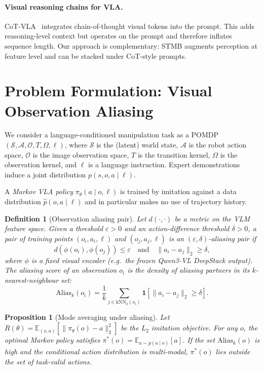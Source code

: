 \documentclass[11pt]{article}
\newtheorem{definition}{Definition}
\newtheorem{proposition}{Proposition}
\begin{document}
\paragraph{Visual reasoning chains for VLA.}
CoT-VLA~\cite{zhao2025cotvla} integrates chain-of-thought visual tokens into
the prompt. This adds reasoning-level context but operates on the prompt and
therefore inflates sequence length. Our approach is complementary: STMB augments
perception at feature level and can be stacked under CoT-style prompts.

\section{Problem Formulation: Visual Observation Aliasing}
\label{sec:problem}

We consider a language-conditioned manipulation task as a POMDP
$(\mathcal{S}, \mathcal{A}, \mathcal{O}, T, \Omega, \ell)$, where $\mathcal{S}$ is
the (latent) world state, $\mathcal{A}$ is the robot action space, $\mathcal{O}$
is the image observation space, $T$ is the transition kernel, $\Omega$ is the
observation kernel, and $\ell$ is a language instruction. Expert demonstrations
induce a joint distribution $p(s, o, a \mid \ell)$.

A \emph{Markov VLA policy} $\pi_\theta(a \mid o, \ell)$ is trained by imitation
against a data distribution $\widehat{p}(o, a \mid \ell)$ and in particular
makes no use of trajectory history.

\begin{definition}[Observation aliasing pair]
\label{def:alias}
Let $d(\cdot,\cdot)$ be a metric on the VLM feature space. Given a threshold
$\varepsilon > 0$ and an action-difference threshold $\delta > 0$, a pair of
training points $(o_i, a_i, \ell)$ and $(o_j, a_j, \ell)$ is an
\emph{$(\varepsilon, \delta)$-aliasing pair} if
\[
d(\phi(o_i), \phi(o_j)) \le \varepsilon \quad \text{and} \quad
\|a_i - a_j\|_2 \ge \delta,
\]
where $\phi$ is a fixed visual encoder (e.g.~the frozen Qwen3-VL DeepStack
output). The \emph{aliasing score} of an observation $o_i$ is the density of
aliasing partners in its $k$-nearest-neighbour set:
\[
\mathrm{Alias}_k(o_i) = \frac{1}{k}\sum_{j \in \mathrm{kNN}_k(o_i)}
\mathbf{1}\!\left[\|a_i - a_j\|_2 \ge \delta\right].
\]
\end{definition}

\begin{proposition}[Mode averaging under aliasing]
\label{prop:modeavg}
Let $R(\theta) = \mathbb{E}_{(o,a)}[\|\pi_\theta(o) - a\|_2^2]$ be the $L_2$
imitation objective. For any $o$, the optimal Markov policy satisfies
$\pi^*(o) = \mathbb{E}_{a \sim p(a \mid o)}[a]$. If the set
$\mathrm{Alias}_k(o)$ is high and the conditional action distribution is
multi-modal, $\pi^*(o)$ lies outside the set of task-valid actions.
\end{proposition}
\end{document}
